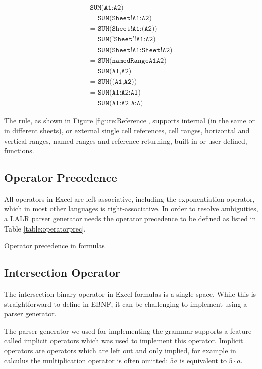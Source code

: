 \documentclass[times]{smrauth}
\begin{document}
\begin{align}
	\texttt{SUM(A1:A2)} \\ 
	\texttt{= SUM(Sheet!A1:A2)} \\
	\texttt{= SUM(Sheet!A1:(A2))} \\
	\texttt{= SUM('Sheet'!A1:A2)} \\
	\texttt{= SUM(Sheet!A1:Sheet!A2)} \\
	\texttt{= SUM(namedRangeA1A2)} \\ 
	\texttt{= SUM(A1,A2)} \\ 
	\texttt{= SUM((A1,A2))} \\ 
	\texttt{= SUM(A1:A2:A1)} \\
	\texttt{= SUM(A1:A2 A:A)} 
\end{align}

The  rule, as shown in Figure \ref{figure:Reference}, supports internal (in the same or in different sheets), or external single cell references, cell ranges, horizontal and vertical ranges, named ranges and reference-returning, built-in or user-defined, functions.

\subsection{Operator Precedence}
\label{sec:operatorprecedence}

All operators in Excel are left-associative, including the exponentiation operator, which in most other languages is right-associative.
In order to resolve ambiguities, a LALR parser generator needs the operator precedence to be defined as listed in Table \ref{table:operatorprec}.

\begin{table}[]
	\centering
	\caption{Operator precedence in formulas}
	\label{table:operatorprec}
	
\end{table}

\subsection{Intersection Operator}

The intersection binary operator in Excel formulas is a single space.
While this is straightforward to define in EBNF, it can be challenging to implement using a parser generator.

The parser generator we used for implementing the grammar supports a feature called implicit operators which was used to implement this operator.
Implicit operators are operators which are left out and only implied, for example in calculus the multiplication operator is often omitted: $5a$ is equivalent to $5 \cdot a$.
\end{document}
